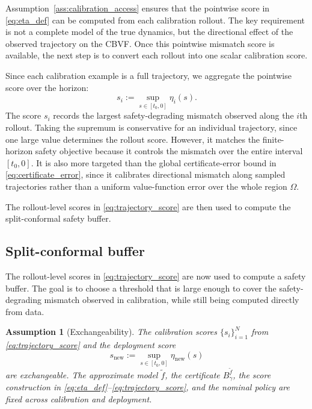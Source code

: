 \documentclass[letterpaper,10pt,conference]{ieeeconf}
\newtheorem{assumption}{Assumption}
\newcommand{\Bm}{B_{\gamma}^{\tilde f}}
\newcommand{\fapp}{\widetilde{f}}
\begin{document}
Assumption~\ref{ass:calibration_access} ensures that the pointwise score in
\eqref{eq:eta_def} can be computed from each calibration rollout. The key
requirement is not a complete model of the true dynamics, but the directional
effect of the observed trajectory on the CBVF. Once this pointwise mismatch
score is available, the next step is to convert each rollout into one scalar
calibration score.

Since each calibration example is a full trajectory, we aggregate the
pointwise score over the horizon:
\begin{equation}
    s_i:=\sup_{s\in[t_0,0]}\eta_i(s).
    \label{eq:trajectory_score}
\end{equation}
The score $s_i$ records the largest safety-degrading mismatch observed along
the $i$th rollout. Taking the supremum is conservative for an individual
trajectory, since one large value determines the rollout score. However, it
matches the finite-horizon safety objective because it controls the mismatch
over the entire interval $[t_0,0]$. It is also more targeted than the global
certificate-error bound in \eqref{eq:certificate_error}, since it calibrates
directional mismatch along sampled trajectories rather than a uniform
value-function error over the whole region $\Omega$.

The rollout-level scores in \eqref{eq:trajectory_score} are then used to
compute the split-conformal safety buffer.

\subsection{Split-conformal buffer}

The rollout-level scores in \eqref{eq:trajectory_score} are now used to compute
a safety buffer. The goal is to choose a threshold that is large enough to cover
the safety-degrading mismatch observed in calibration, while still being
computed directly from data.

\begin{assumption}[Exchangeability]
\label{ass:exchangeability}
The calibration scores $\{s_i\}_{i=1}^N$ from \eqref{eq:trajectory_score} and
the deployment score
\begin{equation}
    s_{\mathrm{new}}
    :=
    \sup_{s\in[t_0,0]}\eta_{\mathrm{new}}(s)
    \label{eq:new_score}
\end{equation}
are exchangeable. The approximate model $\fapp$, the certificate $\Bm$, the
score construction in \eqref{eq:eta_def}--\eqref{eq:trajectory_score}, and the
nominal policy are fixed across calibration and deployment.
\end{assumption}
\end{document}
